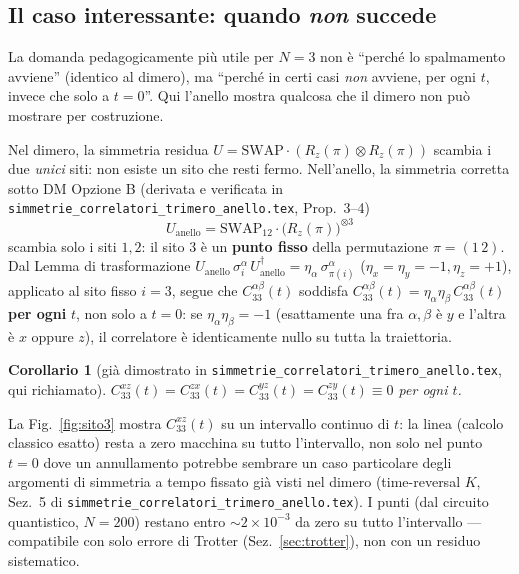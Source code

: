 \documentclass[11pt,a4paper]{article}
\newtheorem{corollario}{Corollario}
\begin{document}
\subsection{Il caso interessante: quando \emph{non} succede}
\label{sec:caso3}

La domanda pedagogicamente più utile per $N=3$ non è ``perché lo spalmamento avviene'' (identico
al dimero), ma ``perché in certi casi \emph{non} avviene, per ogni $t$, invece che solo a
$t=0$''. Qui l'anello mostra qualcosa che il dimero non può mostrare per costruzione.

Nel dimero, la simmetria residua $U=\mathrm{SWAP}\cdot(R_z(\pi)\otimes R_z(\pi))$ scambia i due
\emph{unici} siti: non esiste un sito che resti fermo. Nell'anello, la simmetria corretta sotto
DM Opzione B (derivata e verificata in \texttt{simmetrie\_correlatori\_trimero\_anello.tex},
Prop.~3--4)
\begin{equation}
U_\text{anello} = \mathrm{SWAP}_{12}\cdot\big(R_z(\pi)\big)^{\otimes 3}
\end{equation}
scambia solo i siti $1,2$: il sito $3$ è un \textbf{punto fisso} della permutazione
$\pi=(1\,2)$. Dal Lemma di trasformazione
$U_\text{anello}\,\sigma_i^\alpha\,U_\text{anello}^\dagger=\eta_\alpha\,\sigma_{\pi(i)}^\alpha$
($\eta_x=\eta_y=-1,\eta_z=+1$), applicato al sito fisso $i=3$, segue che $C_{33}^{\alpha\beta}(t)$
soddisfa $C_{33}^{\alpha\beta}(t)=\eta_\alpha\eta_\beta\,C_{33}^{\alpha\beta}(t)$ \textbf{per ogni}
$t$, non solo a $t=0$: se $\eta_\alpha\eta_\beta=-1$ (esattamente una fra $\alpha,\beta$ è $y$ e
l'altra è $x$ oppure $z$), il correlatore è identicamente nullo su tutta la traiettoria.

\begin{corollario}[già dimostrato in \texttt{simmetrie\_correlatori\_trimero\_anello.tex}, qui richiamato]
$C_{33}^{xz}(t)=C_{33}^{zx}(t)=C_{33}^{yz}(t)=C_{33}^{zy}(t)\equiv0$ per ogni $t$.
\end{corollario}

La Fig.~\ref{fig:sito3} mostra $C_{33}^{xz}(t)$ su un intervallo continuo di $t$: la linea (calcolo
classico esatto) resta a zero macchina su tutto l'intervallo, non solo nel punto $t=0$ dove
un annullamento potrebbe sembrare un caso particolare degli argomenti di simmetria a tempo fissato
già visti nel dimero (time-reversal $K$, Sez.~5 di \texttt{simmetrie\_correlatori\_trimero\_anello.tex}).
I punti (dal circuito quantistico, $N=200$) restano entro $\sim2\times10^{-3}$ da zero su tutto
l'intervallo --- compatibile con solo errore di Trotter (Sez.~\ref{sec:trotter}), non con un
residuo sistematico.
\end{document}

